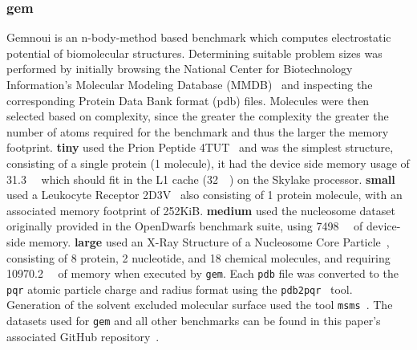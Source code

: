 \documentclass[../document.tex]{subfiles}
\begin{document}
\subsubsection{gem}
Gemnoui is an n-body-method based benchmark which computes electrostatic potential of biomolecular structures.
Determining suitable problem sizes was performed by initially browsing the National Center for Biotechnology Information's Molecular Modeling Database (MMDB)~\cite{madej2013mmdb} and inspecting the corresponding Protein Data Bank format (pdb) files.
Molecules were then selected based on complexity, since the greater the complexity the greater the number of atoms required for the benchmark and thus the larger the memory footprint.
{\bf tiny} used the Prion Peptide 4TUT~\cite{yu2015crystal} and was the simplest structure, consisting of a single protein (1 molecule), it had the device side memory usage of \SI{31.3}{\kibi\byte} which should fit in the L1 cache (\SI{32}{\kibi\byte}) on the Skylake processor.
{\bf small} used a Leukocyte Receptor 2D3V~\cite{shiroishi2006crystal} also consisting of 1 protein molecule, with an associated memory footprint of 252KiB.
{\bf medium} used the nucleosome dataset originally provided in the OpenDwarfs benchmark suite, using \SI{7498}{\kibi\byte} of device-side memory.
{\bf large} used an X-Ray Structure of a Nucleosome Core Particle~\cite{davey2002solvent}, consisting of 8 protein, 2 nucleotide, and 18 chemical molecules, and requiring \SI{10970.2}{\kibi\byte} of memory when executed by {\tt gem}.
Each {\tt pdb} file was converted to the {\tt pqr} atomic particle charge and radius format using the {\tt pdb2pqr}~\cite{dolinsky2004pdb2pqr} tool.
Generation of the solvent excluded molecular surface used the tool {\tt msms}~\cite{sanner1996reduced}.
The datasets used for {\tt gem} and all other benchmarks can be found in this paper's associated GitHub repository~\cite{johnston2017}.

\end{document}
